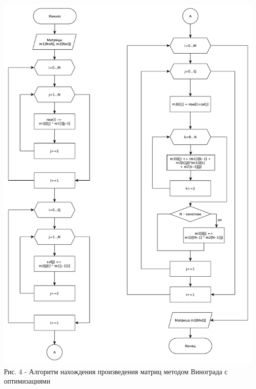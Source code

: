 \documentclass[a4paper,14pt]{article} %
\begin{document}
	\begin{center}
        		\includegraphics[scale = 0.53]{shema3} \\ Рис. 4 - Алгоритм нахождения произведения матриц методом Винограда с оптимизациями
	\end{center}	
	
	\hfill
	
\end{document}
